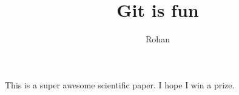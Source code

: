 \documentclass[10pt]{article}
\author{Rohan}
\title{Git is fun}
\begin{document}
		\maketitle

		This is a super awesome scientific paper.
		I hope I win a prize.
\end{document}
